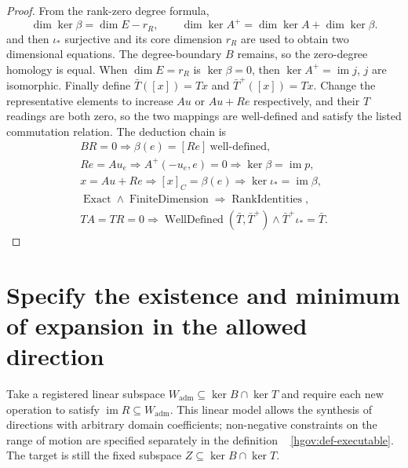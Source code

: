\documentclass[12pt,a4paper,openany,notitlepage]{report}
\theoremstyle{plain}
\theoremstyle{definition}
\theoremstyle{remark}
\begin{document}
\begin{CJK*}
\begin{proof}
From the rank-zero degree formula, \[
 \dim\ker\beta=\dim E-r_R,\qquad
 \dim\ker A^+=\dim\ker A+\dim\ker\beta.
\] and then $\iota_*$ surjective and its core dimension $r_R$ are used to obtain two dimensional equations. The degree-boundary $B$ remains, so the zero-degree homology is equal. When $\dim E=r_R$ is $\ker\beta=0$, then $\ker A^+=\operatorname{im}j$, $j$ are isomorphic. Finally define $\bar T([x])=Tx$ and $\bar T^+([x])=Tx$. Change the representative elements to increase $Au$ or $Au+Re$ respectively, and their $T$ readings are both zero, so the two mappings are well-defined and satisfy the listed commutation relation. The deduction chain is \[
 \begin{gathered}
 BR=0\Rightarrow\beta(e)=[Re]\ \text{well-defined},\\
 Re=Au_e
 \Rightarrow A^+(-u_e,e)=0
 \Rightarrow\ker\beta=\operatorname{im}p,\\
 x=Au+Re
 \Rightarrow[x]_C=\beta(e)
 \Rightarrow\ker\iota_*=\operatorname{im}\beta,\\
 \operatorname{Exact}\land\operatorname{FiniteDimension}
 \Rightarrow\operatorname{RankIdentities},\\
 TA=TR=0\Rightarrow
 \operatorname{WellDefined}(\bar T,\bar T^+)
 \land\bar T^+\iota_*=\bar T.
 \end{gathered}
\]\end{proof}


\section { Specify the existence and minimum of expansion in the allowed direction }\label{exp:hom:restricted-directions}


Take a registered linear subspace $W_{\mathrm{adm}}\subseteq\ker B\cap\ker T$ and require each new operation to satisfy $\operatorname{im}R\subseteq W_{\mathrm{adm}}$. This linear model allows the synthesis of directions with arbitrary domain coefficients; non-negative constraints on the range of motion are specified separately in the definition ~ \ref{hgov:def-executable}. The target is still the fixed subspace $Z\subseteq\ker B\cap\ker T$.


\end{CJK*}
\end{document}
